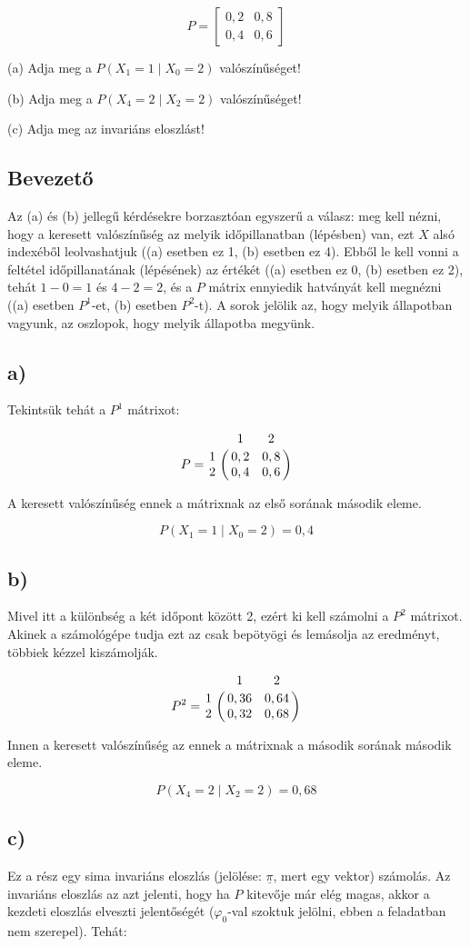 \documentclass[a4paper,12pt]{article}
\begin{document}
\[
P = 
\begin{bmatrix} 
0,2    &    0,8 \\
0,4    &    0,6
\end{bmatrix}
\]

(a) Adja meg a $P(X_1 = 1 \mid X_0 = 2)$ valószínűséget!

(b) Adja meg a $P(X_4 = 2 \mid X_2 = 2)$ valószínűséget!

(c) Adja meg az invariáns eloszlást!

\subsection*{Bevezető}
Az (a) és (b) jellegű kérdésekre borzasztóan egyszerű a válasz:
meg kell nézni, hogy a keresett valószínűség az  melyik időpillanatban 
(lépésben) van, ezt $X$ alsó indexéből leolvashatjuk ((a) esetben ez 1,
(b) esetben ez 4). 
Ebből le kell vonni a feltétel időpillanatának (lépésének) az értékét 
((a) esetben ez 0, (b) esetben ez 2), tehát $1-0=1$ és $4-2=2$, és a 
$P$ mátrix ennyiedik hatványát kell megnézni
((a) esetben $P^1$-et, (b) esetben $P^2$-t). A sorok jelölik az, hogy 
melyik állapotban vagyunk, az oszlopok, hogy melyik állapotba megyünk.

\subsection*{a)}
Tekintsük tehát a $P^1$ mátrixot:

\[
P = 
\bordermatrix{
~	&	1	&	2	\cr
1	&	0,2	&	0,8	\cr
2	&	0,4	&	0,6}
\]

A keresett valószínűség ennek a mátrixnak az első sorának második eleme.

\[
P(X_1 = 1 \mid X_0 = 2) = 0,4
\]

\subsection*{b)}
Mivel itt a különbség a két időpont között 2, ezért ki kell számolni a 
$P^2$ mátrixot. Akinek a számológépe tudja ezt az csak bepötyögi és 
lemásolja az eredményt,  többiek kézzel kiszámolják.

\[
P^2 = 
\bordermatrix{
~	&	1	    &	2    	\cr
1	&	0,36	&	0,64	\cr
2	&	0,32	&	0,68}
\]

Innen a keresett valószínűség az ennek a mátrixnak a második sorának
második eleme.

\[
P(X_4 = 2 \mid X_2 = 2) = 0,68
\]

\subsection*{c)}
Ez a rész egy sima invariáns eloszlás (jelölése: $\underline{\pi}$, 
mert egy vektor) számolás. Az invariáns eloszlás 
az azt jelenti, hogy ha $P$ kitevője már elég magas, akkor a kezdeti
eloszlás elveszti jelentőségét ($\varphi_0$-val szoktuk jelölni, ebben a
feladatban nem szerepel). Tehát:
\end{document}
